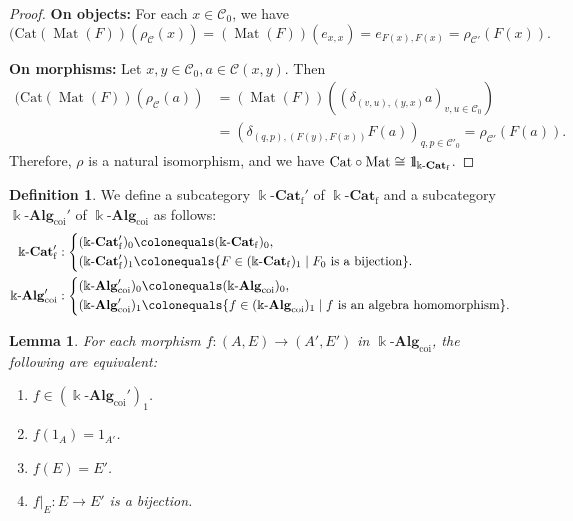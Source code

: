 \documentclass{surv-l}
\numberwithin{equation}{chapter}
\numberwithin{figure}{chapter}
\theoremstyle{plain}
\newtheorem{lem}[thm]{Lemma}
\theoremstyle{definition}
\newtheorem{dfn}[thm]{Definition}
\theoremstyle{remark}
\newcommand{\id}{1\kern-.25em{\text{{\rm l}}}}
\newcommand{\kCat}{\Bbbk\text{-}\mathbf{Cat}}
\DeclareMathOperator{\Mat}{Mat}
\begin{document}
\begin{proof}
{\bf On objects:}
For each $x \in {\mathcal{C}}_0$, we have
\[
(\mathrm{Cat}(\Mat(F))(\rho_{\mathcal{C}}(x)) = (\Mat(F))(e_{x,x}) = e_{F(x),F(x)}
=\rho_{{\mathcal{C}}'}(F(x)).
\]

{\bf On morphisms:}
Let $x,y \in {\mathcal{C}}_0, a \in {\mathcal{C}}(x,y)$.
Then
\[
\begin{aligned}
(\mathrm{Cat}(\Mat(F))(\rho_{\mathcal{C}}(a)) &= (\Mat(F))((\delta_{(v,u),(y,x)}a)_{v,u\in {\mathcal{C}}_0})\\
&= (\delta_{(q,p),(F(y),F(x))}F(a))_{q,p \in {\mathcal{C}}'_0}
=\rho_{{\mathcal{C}}'}(F(a)).
\end{aligned}
\]
Therefore, $\rho$ is a natural isomorphism, and we have $\mathrm{Cat}\circ \Mat \cong \id_{\kCat_{\mathrm{f}}}$.
\end{proof}

\begin{dfn}
We define a subcategory $\kCat_{\mathrm{f}}'$ of $\kCat_{\mathrm{f}}$ and
a subcategory $\Bbbk\text{-}\mathbf{Alg}_{\mathrm{coi}}'$ of $\Bbbk\text{-}\mathbf{Alg}_{\mathrm{coi}}$ as follows:
\[
\begin{aligned}
\kCat_{\mathrm{f}}'&: \left\{
\begin{aligned}
(\kCat_{\mathrm{f}}')_0&\colonequals  (\kCat_{\mathrm{f}})_0,\\
(\kCat_{\mathrm{f}}')_1&\colonequals  \{F \in (\kCat_{\mathrm{f}})_1 \mid F_0 \text{ is a bijection}\}.
\end{aligned}
\right.\\
\Bbbk\text{-}\mathbf{Alg}_{\mathrm{coi}}'&: \left\{
\begin{aligned}
(\Bbbk\text{-}\mathbf{Alg}_{\mathrm{coi}}')_0&\colonequals  (\Bbbk\text{-}\mathbf{Alg}_{\mathrm{coi}})_0,\\
(\Bbbk\text{-}\mathbf{Alg}_{\mathrm{coi}}')_1&\colonequals  \{f \in (\Bbbk\text{-}\mathbf{Alg}_{\mathrm{coi}})_1 \mid f \text{ is an algebra homomorphism}\}.
\end{aligned}
\right.
\end{aligned}
\]
\end{dfn}

\begin{lem}\label{lem:pres1_bij}
For each morphism $f\colon (A,E) \to (A',E')$ in $\Bbbk\text{-}\mathbf{Alg}_{\mathrm{coi}}$,
the following are equivalent:
\begin{enumerate}
	\item $f \in (\Bbbk\text{-}\mathbf{Alg}_{\mathrm{coi}}')_1$.
	\item $f(1_A) = 1_{A'}$.
	\item $f(E) = E'$.
	\item $f|_E \colon E \to E'$ is a bijection.
\end{enumerate}
\end{lem}
\end{document}
